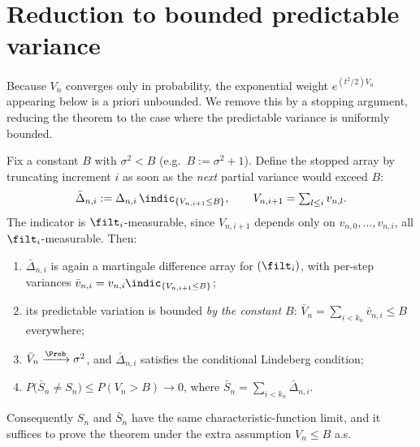 \section{Reduction to bounded predictable variance}
\label{sec:pre_clt_trunc}

Because $V_n$ converges only in probability, the exponential weight
$e^{(t^2/2)V_n}$ appearing below is a priori unbounded. We remove this by a
stopping argument, reducing the theorem to the case where the predictable
variance is uniformly bounded.

\begin{lemma}\label{lem:clt_truncation}
\leanok
Fix a constant $B$ with $\sigma^2<B$ (e.g.\ $B:=\sigma^2+1$). Define the stopped
array by truncating increment $i$ as soon as the \emph{next} partial variance
would exceed $B$:
\[
  \bar\Delta_{n,i}:=\Delta_{n,i}\,\indic_{\{V_{n,i+1}\le B\}},
  \qquad V_{n,i+1}=\textstyle\sum_{l\le i}v_{n,l}.
\]
The indicator is $\filt_i$-measurable, since $V_{n,i+1}$ depends only on
$v_{n,0},\dots,v_{n,i}$, all $\filt_i$-measurable. Then:
\begin{enumerate}
  \item[(i)] $\bar\Delta_{n,i}$ is again a martingale difference array for
        $(\filt_i)$, with per-step variances
        $\bar v_{n,i}=v_{n,i}\indic_{\{V_{n,i+1}\le B\}}$;
  \item[(ii)] its predictable variation is bounded \emph{by the constant $B$}:
        $\bar V_n=\sum_{i<k_n}\bar v_{n,i}\le B$ everywhere;
  \item[(iii)] $\bar V_n\xrightarrow{\Prob}\sigma^2$, and $\bar\Delta_{n,i}$
        satisfies the conditional Lindeberg condition;
  \item[(iv)] $P\big(\bar S_n\ne S_n\big)\le P(V_n>B)\to0$, where
        $\bar S_n=\sum_{i<k_n}\bar\Delta_{n,i}$.
\end{enumerate}
Consequently $S_n$ and $\bar S_n$ have the same characteristic-function limit, and
it suffices to prove the theorem under the extra assumption $V_n\le B$ a.s.
\end{lemma}

